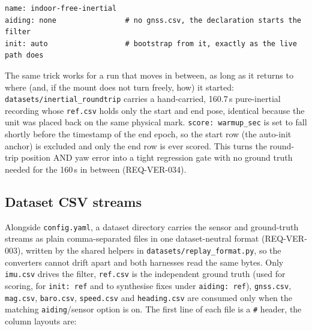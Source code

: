 \documentclass[11pt,a4paper]{article}
\newcommand{\code}[1]{\texttt{#1}}
\begin{document}
\begin{lstlisting}[style=cfg]
name: indoor-free-inertial
aiding: none                # no gnss.csv, the declaration starts the filter
init: auto                  # bootstrap from it, exactly as the live path does
\end{lstlisting}

The same trick works for a run that moves in between, as long as it returns to
where (and, if the mount does not turn freely, how) it started:
\code{datasets/inertial\_\allowbreak{}roundtrip} carries a hand-carried,
160.7\,s pure-inertial recording whose \code{ref.csv} holds only the start and
end pose, identical because the unit was placed back on the same physical
mark. \code{score: warmup\_\allowbreak{}sec} is set to fall shortly before the
timestamp of the end epoch, so the start row (the auto-init anchor) is excluded
and only the end row is ever scored. This turns the round-trip position AND yaw
error into a tight regression gate with no ground truth needed for the 160\,s in
between (REQ-VER-034).

\subsection{Dataset CSV streams}
\label{sec:csvformat}

Alongside \code{config.yaml}, a dataset directory carries the sensor and
ground-truth streams as plain comma-separated files in one dataset-neutral
format (REQ-VER-003), written by the shared helpers in
\code{datasets/replay\_\allowbreak{}format.py}, so the converters cannot drift apart and both
harnesses read the same bytes. Only \code{imu.csv} drives the filter,
\code{ref.csv} is the independent ground truth (used for scoring, for
\code{init: ref} and to synthesise fixes under \code{aiding: ref}),
\code{gnss.csv}, \code{mag.csv}, \code{baro.csv}, \code{speed.csv} and
\code{heading.csv} are consumed only when the matching \code{aiding}/sensor option is on. The
first line of each file is a \code{\#} header, the column layouts are:
\end{document}
